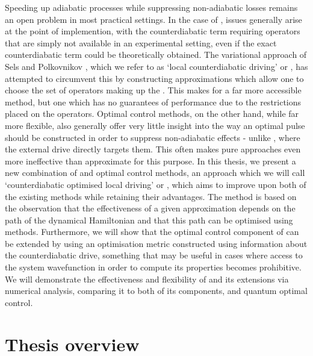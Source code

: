 Speeding up adiabatic processes while suppressing non-adiabatic losses remains an open problem in most practical settings. In the case of , issues generally arise at the point of implemention, with the counterdiabatic term requiring operators that are simply not available in an experimental setting, even if the exact counterdiabatic term could be theoretically obtained. The variational approach of Sels and Polkovnikov \cite{sels_minimizing_2017}, which we refer to as `local counterdiabatic driving' or , has attempted to circumvent this by constructing approximations which allow one to choose the set of operators making up the . This makes for a far more accessible method, but one which has no guarantees of performance due to the restrictions placed on the operators. Optimal control methods, on the other hand, while far more flexible, also generally offer very little insight into the way an optimal pulse should be constructed in order to suppress non-adiabatic effects - unlike , where the external drive directly targets them. This often makes pure  approaches even more ineffective than approximate  for this purpose. In this thesis, we present a new combination of  and optimal control methods, an approach which we will call `counterdiabatic optimised local driving' or  \cite{cepaite_counterdiabatic_2023}, which aims to improve upon both of the existing methods while retaining their advantages. The method is based on the observation that the effectiveness of a given  approximation depends on the path of the dynamical Hamiltonian and that this path can be optimised using  methods. Furthermore, we will show that the optimal control component of  can be extended by using an optimisation metric constructed using information about the counterdiabatic drive, something that may be useful in cases where access to the system wavefunction in order to compute its properties becomes prohibitive. We will demonstrate the effectiveness and flexibility of  and its extensions via numerical analysis, comparing it to both of its components,  and quantum optimal control.

\section{Thesis overview}

